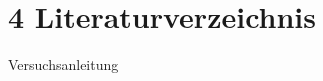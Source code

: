 \chapter*{4 Literaturverzeichnis}
\setcounter{chapter}{4}
\setcounter{section}{0}
\setcounter{subsection}{0}

\begin{list}{\textbullet}{}
    \item Versuchsanleitung \label{an:Anleitung}
 
\end{list}